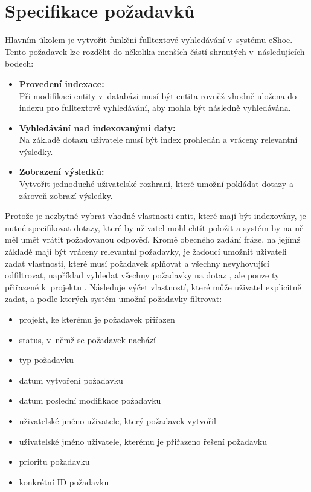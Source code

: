 \documentclass[11pt,oneside]{fithesis2}
\begin{document}
\section{Specifikace požadavků}
\label{SpecifikacePozadavku}
Hlavním úkolem je vytvořit funkční fulltextové vyhledávání v~systému eShoe. Tento požadavek lze rozdělit do několika menších částí shrnutých v~následujících bodech:
\begin{itemize}
	\item \textbf{Provedení indexace:} \\ 
		 Při modifikaci entity v~databázi musí být entita rovněž vhodně uložena do indexu pro fulltextové vyhledávání, aby mohla být následně vyhledávána.

	\item \textbf{Vyhledávání nad indexovanými daty:} \\
		Na základě dotazu uživatele musí být index prohledán a vráceny relevantní výsledky.

	\item \textbf{Zobrazení výsledků:} \\
		Vytvořit jednoduché uživatelské rozhraní, které umožní pokládat dotazy a zároveň zobrazí výsledky.		
\end{itemize}

Protože je nezbytné vybrat vhodné vlastnosti entit, které mají být indexovány, je nutné specifikovat dotazy, které by uživatel mohl chtít položit a systém by na ně měl umět vrátit požadovanou odpověď. Kromě obecného zadání fráze, na jejímž základě mají být vráceny relevantní požadavky, je žadoucí umožnit uživateli zadat vlastnosti, které musí požadavek splňovat a všechny nevyhovující odfiltrovat, například vyhledat všechny požadavky na dotaz , ale pouze ty přiřazené k~projektu . Následuje výčet vlastností, které může uživatel explicitně zadat, a podle kterých systém umožní požadavky filtrovat:
\begin{itemize}
	\item projekt, ke kterému je požadavek přiřazen
	\item status, v~němž se požadavek nachází
	\item typ požadavku
	\item datum vytvoření požadavku
	\item datum poslední modifikace požadavku
	\item uživatelské jméno uživatele, který požadavek vytvořil
	\item uživatelské jméno uživatele, kterému je přiřazeno řešení požadavku
	\item prioritu požadavku
	\item konkrétní ID požadavku	 
\end{itemize}
\end{document}
